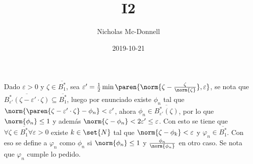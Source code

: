 \documentclass{homework}
\title{I2}
\date{2019-10-21}
\author{Nicholas Mc-Donnell}
\begin{document}
\maketitle
\newpage
{}

\newcommand{\e}{\varepsilon}

\begin{sol}
    Dado \(\e>0\) y \(\zeta\in \overline{B^*_1}\), sea \(\e'=\frac12\min\paren{\norm{\zeta-\frac{\zeta}{\norm{\zeta}}},\e}\), se nota que \(\overline{B^*_{\e'}(\zeta-\e'\cdot\zeta)}\subseteq\overline{B^*_1}\), luego por enunciado existe \(\phi_n\) tal que \(\norm{\paren{\zeta-\e'\cdot\zeta}-\phi_n}<\e'\), ahora \(\phi_n\in\overline{B^*_{\e'}(\zeta)}\), por lo que \(\norm{\phi_n}\leq 1\) y además \(\norm{\zeta-\phi_n}<2\e'\leq\e\). Con esto se tiene que \(\forall\zeta\in\overline{B^*_1}\forall\e>0\) existe \(k\in\set{N}\) tal que \(\norm{\zeta-\phi_k}<\e\) y \(\varphi_n\in\overline{B^*_1}\). Con eso se define a \(\varphi_n\) como \(\phi_n\) si \(\norm{\phi_n}\leq1\) y \(\frac{\phi_n}{\norm{\phi_n}}\) en otro caso. Se nota que \(\varphi_n\) cumple lo pedido.
\end{sol}
\end{document}
